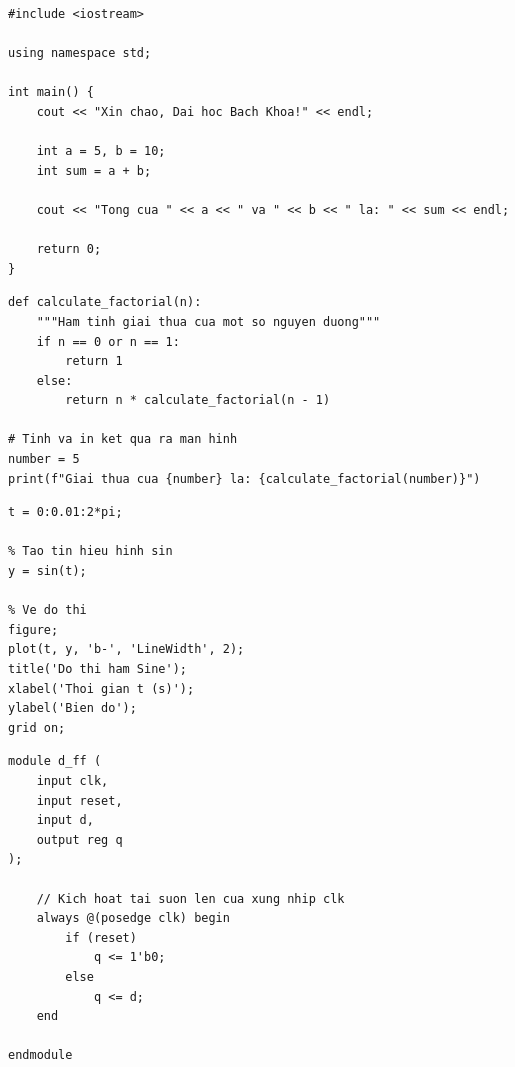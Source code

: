 \documentclass[12pt, a4paper, oneside]{article}
\begin{document}

\begin{lstlisting}[style=prettyc, caption={Code C++: Tính tổng hai số}]
#include <iostream>

using namespace std;

int main() {
    cout << "Xin chao, Dai hoc Bach Khoa!" << endl;
    
    int a = 5, b = 10;
    int sum = a + b;
    
    cout << "Tong cua " << a << " va " << b << " la: " << sum << endl;
    
    return 0;
}
\end{lstlisting}

\begin{lstlisting}[style=prettypython, caption={Code Python: Hàm tính giai thừa}]
def calculate_factorial(n):
    """Ham tinh giai thua cua mot so nguyen duong"""
    if n == 0 or n == 1:
        return 1
    else:
        return n * calculate_factorial(n - 1)

# Tinh va in ket qua ra man hinh
number = 5
print(f"Giai thua cua {number} la: {calculate_factorial(number)}")
\end{lstlisting}

\begin{lstlisting}[style=prettymatlab, caption={Code MATLAB: Vẽ đồ thị tín hiệu Sine}]
% Khoi tao truc thoi gian tu 0 den 2*pi, buoc nhay 0.01
t = 0:0.01:2*pi;

% Tao tin hieu hinh sin
y = sin(t);

% Ve do thi
figure;
plot(t, y, 'b-', 'LineWidth', 2);
title('Do thi ham Sine');
xlabel('Thoi gian t (s)');
ylabel('Bien do');
grid on;
\end{lstlisting}


\begin{lstlisting}[style=prettyverilog, caption={Code Verilog: Thiết kế D Flip-Flop}]
module d_ff (
    input clk,
    input reset,
    input d,
    output reg q
);

    // Kich hoat tai suon len cua xung nhip clk
    always @(posedge clk) begin
        if (reset)
            q <= 1'b0;
        else
            q <= d;
    end

endmodule
\end{lstlisting}

\newpage
\end{document}
